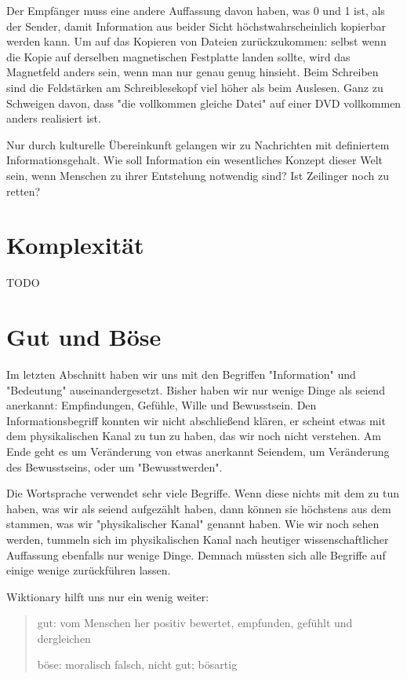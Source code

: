 \documentclass[12pt]{book}
\begin{document}
Der Empfänger muss eine andere Auffassung davon haben, was 0 und 1 ist, als der Sender, damit Information aus beider Sicht höchstwahrscheinlich kopierbar werden kann. Um auf das Kopieren von Dateien zurückzukommen: selbst wenn die Kopie auf derselben magnetischen Festplatte landen sollte, wird das Magnetfeld anders sein, wenn man nur genau genug hinsieht. Beim Schreiben sind die Feldstärken am Schreiblesekopf viel höher als beim Auslesen. Ganz zu Schweigen davon, dass "die vollkommen gleiche Datei" auf einer DVD vollkommen anders realisiert ist. 

Nur durch kulturelle Übereinkunft gelangen wir zu Nachrichten mit definiertem Informationsgehalt. Wie soll Information ein wesentliches Konzept dieser Welt sein, wenn Menschen zu ihrer Entstehung notwendig sind? Ist Zeilinger noch zu retten? 

\section{Komplexität}

TODO

\section{Gut und Böse}

Im letzten Abschnitt haben wir uns mit den Begriffen "Information" und "Bedeutung" auseinandergesetzt. Bisher haben wir nur wenige Dinge als seiend anerkannt: Empfindungen, Gefühle, Wille und Bewusstsein. Den Informationsbegriff konnten wir nicht abschließend klären, er scheint etwas mit dem physikalischen Kanal zu tun zu haben, das wir noch nicht  verstehen. Am Ende geht es um Veränderung von etwas anerkannt Seiendem, um Veränderung des Bewusstseins, oder um "Bewusstwerden".

Die Wortsprache verwendet sehr viele Begriffe. Wenn diese nichts mit dem zu tun haben, was wir als seiend aufgezählt haben, dann können sie höchstens aus dem stammen, was wir "physikalischer Kanal" genannt haben. Wie wir noch sehen werden, tummeln sich im physikalischen Kanal nach heutiger wissenschaftlicher Auffassung ebenfalls nur wenige Dinge. Demnach müssten sich alle Begriffe auf einige wenige zurückführen lassen.

Wiktionary hilft uns nur ein wenig weiter:
\begin{quote}\begin{tcolorbox}
gut: vom Menschen her positiv bewertet, empfunden, gefühlt und dergleichen

böse: moralisch falsch, nicht gut; bösartig
\end{tcolorbox}\end{quote}
\end{document}
